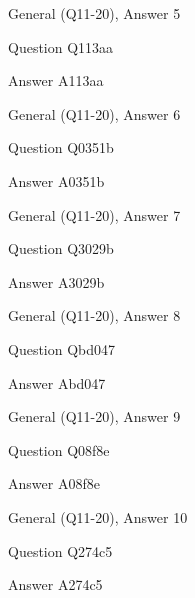 \documentclass[11pt]{beamer}
\begin{document}
\begin{frame}[t]{General (Q11-20), Answer 5}
\vspace{2em}
\begin{block}{Question}
Q113aa
\end{block}
\pause{}
\begin{block}{Answer}
A113aa
\end{block}
\end{frame}
    

\begin{frame}[t]{General (Q11-20), Answer 6}
\vspace{2em}
\begin{block}{Question}
Q0351b
\end{block}
\pause{}
\begin{block}{Answer}
A0351b
\end{block}
\end{frame}
    

\begin{frame}[t]{General (Q11-20), Answer 7}
\vspace{2em}
\begin{block}{Question}
Q3029b
\end{block}
\pause{}
\begin{block}{Answer}
A3029b
\end{block}
\end{frame}
    

\begin{frame}[t]{General (Q11-20), Answer 8}
\vspace{2em}
\begin{block}{Question}
Qbd047
\end{block}
\pause{}
\begin{block}{Answer}
Abd047
\end{block}
\end{frame}
    

\begin{frame}[t]{General (Q11-20), Answer 9}
\vspace{2em}
\begin{block}{Question}
Q08f8e
\end{block}
\pause{}
\begin{block}{Answer}
A08f8e
\end{block}
\end{frame}
    

\begin{frame}[t]{General (Q11-20), Answer 10}
\vspace{2em}
\begin{block}{Question}
Q274c5
\end{block}
\pause{}
\begin{block}{Answer}
A274c5
\end{block}
\end{frame}
    
\end{document}
